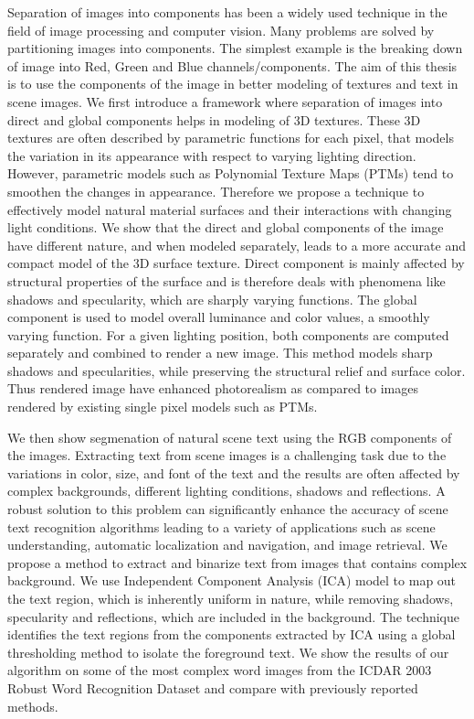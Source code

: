 Separation of images into components has been a widely used technique in the field of image processing and computer vision.
Many problems are solved by partitioning images into components. The simplest example
is the breaking down of image into Red, Green and Blue channels/components. The aim of this thesis is to use
the components of the image in better modeling of textures and text in scene images.
We first introduce a framework where separation of images 
into direct and global components helps in modeling of 3D textures.
These 3D textures are often described by parametric functions for each pixel, that
models the variation in its appearance with respect to varying lighting
direction. However, parametric models such as Polynomial Texture Maps (PTMs)
tend to smoothen the changes in appearance. Therefore we propose a technique to
effectively model natural material surfaces and their interactions with changing
light conditions. We show that the direct and global components of the image
have different nature, and when modeled separately, leads to a more accurate and
compact model of the 3D surface texture. Direct component is mainly affected by
structural properties of the surface and is therefore deals with phenomena like
shadows and specularity, which are sharply varying functions. The global
component is used to model overall luminance and color values, a smoothly
varying function. For a given lighting position, both components are computed
separately and combined to render a new image. This method models sharp shadows
and specularities, while preserving the structural relief and surface color.
Thus rendered image have enhanced photorealism as compared to images rendered by
existing single pixel models such as PTMs. 

We then show segmenation of natural scene text using the RGB components of the images.
Extracting text from scene images is a challenging task due to the variations in color, size, and font
of the text and the results are often affected by complex backgrounds, 
different lighting conditions, shadows and reflections.
A robust solution to this problem can significantly enhance
the accuracy of scene text recognition algorithms leading to a
variety of applications such as scene understanding, automatic
localization and navigation, and image retrieval. 
We propose a method to extract and binarize text from images
that contains complex background. We use Independent
Component Analysis (ICA) model to map out the text
region, which is inherently uniform in nature, while removing
shadows, specularity and reflections, which are included in
the background. The technique identifies the text regions from
the components extracted by ICA using a global thresholding
method to isolate the foreground text. We show the results
of our algorithm on some of the most complex word images
from the ICDAR 2003 Robust Word Recognition Dataset and
compare with previously reported methods.
